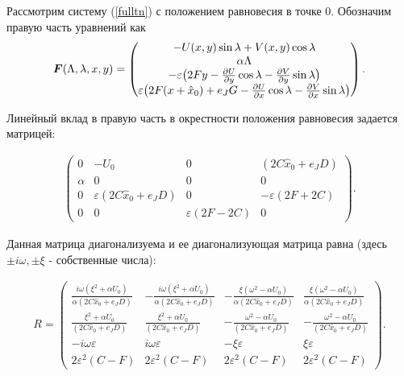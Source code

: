 Рассмотрим систему (\ref{fulltn}) с положением равновесия в точке $0$.
Обозначим правую часть уравнений как
\begin{align*}
\boldsymbol{F}(\Lambda,\lambda,x,y) = 
\begin{pmatrix}
- U(x,y) \sin \lambda + V(x,y) \cos \lambda \\
\alpha \Lambda \\
-\varepsilon \big( 2Fy-\frac{\partial U}{\partial y} \cos \lambda - \frac{\partial V}{\partial y} \sin \lambda \big) \\
\varepsilon \big( 2F(x+\hat x_0)+e_JG -\frac{\partial U}{\partial x} \cos \lambda - \frac{\partial V}{\partial x} \sin \lambda \big)
\end{pmatrix}.
\end{align*}

Линейный вклад в правую часть в окрестности положения равновесия задается матрицей:

\begin{align*}
\begin{pmatrix}
0 & -U_0 & 0 & (2C \hat x_0 + e_J D) \\
\alpha & 0 & 0 & 0 \\
0 & \varepsilon (2C \hat x_0 + e_J D) & 0 & -\varepsilon (2F+2C) \\
0 & 0 & \varepsilon (2F-2C) & 0 
\end{pmatrix}.
\end{align*}

Данная матрица диагонализуема и ее диагонализующая матрица равна (здесь $\pm i \omega, \pm \xi$ - собственные числа):

\begin{align}
R = 
\begin{pmatrix}
\frac{i \omega (\xi^2+\alpha U_0)}{\alpha (2C \hat x_0 + e_J D)} & -\frac{i \omega (\xi^2+\alpha U_0)}{\alpha (2C \hat x_0 + e_J D)} & -\frac{\xi (\omega^2 - \alpha U_0)}{\alpha  (2C \hat x_0 + e_J D)} & \frac{\xi (\omega^2 - \alpha U_0)}{\alpha (2C \hat x_0 + e_J D)} \\
\frac{\xi^2+\alpha U_0}{ (2C \hat x_0 + e_J D)} & \frac{\xi^2+\alpha U_0}{ (2C \hat x_0 + e_J D)} & -\frac{\omega^2 - \alpha U_0}{(2C \hat x_0 + e_J D)} & -\frac{\omega^2 -\alpha U_0}{(2C \hat x_0 + e_J D)} \\
-i \omega \varepsilon & i \omega \varepsilon & -\xi \varepsilon & \xi \varepsilon \\
2\varepsilon^2(C-F) & 2\varepsilon^2(C-F) & 2\varepsilon^2(C-F) & 2\varepsilon^2(C-F) 
\end{pmatrix}.
\end{align}

